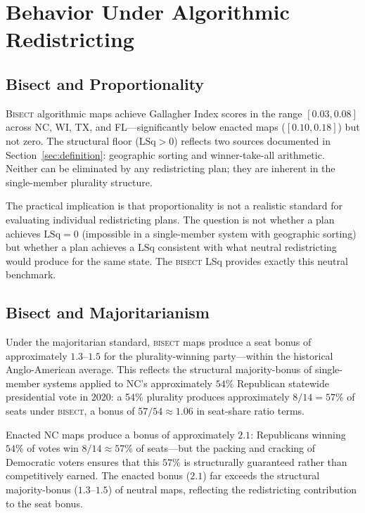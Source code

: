 \section{Behavior Under Algorithmic Redistricting}
\label{sec:behavior}

\subsection{Bisect and Proportionality}

\textsc{Bisect} algorithmic maps achieve Gallagher Index scores in the range
$[0.03, 0.08]$ across NC, WI, TX, and FL---significantly below enacted maps
($[0.10, 0.18]$) but not zero. The structural floor ($\text{LSq} > 0$) reflects
two sources documented in Section~\ref{sec:definition}: geographic sorting
and winner-take-all arithmetic. Neither can be eliminated by any redistricting
plan; they are inherent in the single-member plurality structure.

The practical implication is that proportionality is not a realistic standard
for evaluating individual redistricting plans. The question is not whether a plan
achieves $\text{LSq} = 0$ (impossible in a single-member system with geographic
sorting) but whether a plan achieves a $\text{LSq}$ consistent with what neutral
redistricting would produce for the same state. The \textsc{bisect} LSq provides
exactly this neutral benchmark.

\subsection{Bisect and Majoritarianism}

Under the majoritarian standard, \textsc{bisect} maps produce a seat bonus of
approximately $1.3$--$1.5$ for the plurality-winning party---within the historical
Anglo-American average. This reflects the structural majority-bonus of single-member
systems applied to NC's approximately $54\%$ Republican statewide presidential vote
in 2020: a 54\% plurality produces approximately $8/14 = 57\%$ of seats under
\textsc{bisect}, a bonus of $57/54 \approx 1.06$ in seat-share ratio terms.

Enacted NC maps produce a bonus of approximately $2.1$: Republicans winning $54\%$
of votes win $8/14 \approx 57\%$ of seats---but the packing and cracking of Democratic
voters ensures that this $57\%$ is structurally guaranteed rather than competitively
earned. The enacted bonus ($2.1$) far exceeds the structural majority-bonus ($1.3$--$1.5$)
of neutral maps, reflecting the redistricting contribution to the seat bonus.

